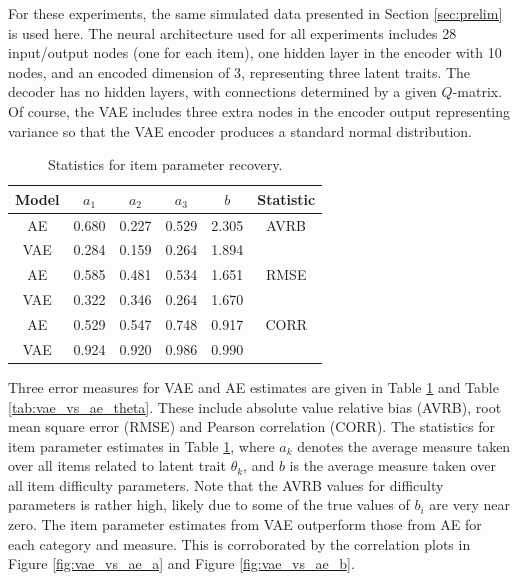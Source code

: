 For these experiments, the same simulated data presented in Section \ref{sec:prelim} is used here. The neural architecture used for all experiments includes 28 input/output nodes (one for each item), one hidden layer in the encoder with 10 nodes, and an encoded dimension of 3, representing three latent traits. The decoder has no hidden layers, with connections determined by a given $Q$-matrix. Of course, the VAE includes three extra nodes in the encoder output representing variance so that the VAE encoder produces a standard normal distribution.

\begin{table}[h]
\centering
\begin{tabular}{cccccc}
\hline
Model   & $a_1$ & $a_2$ & $a_3$ & $b$ & Statistic \\
\hline
AE & 0.680 & 0.227 & 0.529 & 2.305 & AVRB \\
VAE   &0.284  & 0.159 & 0.264 & 1.894 &  \\
\hline
AE & 0.585 & 0.481 & 0.534 & 1.651 & RMSE \\
VAE   & 0.322 & 0.346 & 0.264 & 1.670 & \\
\hline
AE & 0.529 & 0.547 & 0.748 & 0.917 & CORR \\
VAE   & 0.924 & 0.920 & 0.986 & 0.990 & \\
\hline
\end{tabular}
\caption{Statistics for item parameter recovery.}
\label{tab:vae_vs_ae_items}
\end{table}

Three error measures for VAE and AE estimates are given in Table \ref{tab:vae_vs_ae_items} and Table \ref{tab:vae_vs_ae_theta}. These include absolute value relative bias (AVRB), root mean square error (RMSE) and Pearson correlation (CORR). The statistics for item parameter estimates in Table \ref{tab:vae_vs_ae_items}, where $a_k$ denotes the average measure taken over all items related to latent trait $\theta_k$, and $b$ is the average measure taken over all item difficulty parameters. Note that the AVRB values for difficulty parameters is rather high, likely due to some of the true values of $b_i$ are very near zero. The item parameter estimates from VAE outperform those from AE for each category and measure. This is corroborated by the correlation plots in Figure \ref{fig:vae_vs_ae_a} and Figure \ref{fig:vae_vs_ae_b}.

